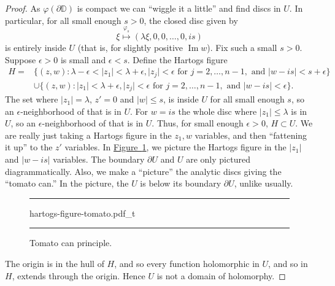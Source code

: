 \documentclass[12pt,openany]{book}
\renewcommand{\Im}{\operatorname{Im}}
\newcommand{\sabs}[1]{\lvert {#1} \rvert}
\newcommand{\D}{{\mathbb{D}}}
\theoremstyle{plain}
\theoremstyle{remark}
\theoremstyle{definition}
\newenvironment{myfig}{%
\begin{figure}[h!t]
\noindent\rule{\textwidth}{0.5pt}\vspace{12pt}\par\centering}%
{\par\noindent\rule{\textwidth}{0.5pt}
\end{figure}}
\theoremstyle{exercise}
\theoremstyle{example}
\newcommand{\figureref}[1]{\hyperref[#1]{Figure~\ref*{#1}}}
\begin{document}
\begin{proof}
As $\varphi(\partial \D)$ is compact we can ``wiggle it a little'' and
find discs in $U$.  In particular, for all small enough $s > 0$,
the closed disc given by
\begin{equation*}
\xi \overset{\varphi_s}{\mapsto} (\lambda \xi, 0, 0, \ldots, 0, i s) 
\end{equation*}
is entirely inside $U$ (that is, for slightly positive $\Im w$).
Fix such a small $s > 0$.
Suppose $\epsilon > 0$ is small and $\epsilon < s$.
Define the Hartogs figure
\begin{equation*}
\begin{split}
H =
& \bigl\{ (z,w) : \lambda - \epsilon < \sabs{z_1} < \lambda + \epsilon,
\sabs{z_j} < \epsilon \text{ for } j=2,\ldots,n-1, \text{ and }
\sabs{w-is} < s+\epsilon \bigr\} 
\\
&
\cup 
\bigl\{ (z,w) : \sabs{z_1} < \lambda + \epsilon, 
\sabs{z_j} < \epsilon \text{ for } j=2,\ldots,n-1, \text{ and }
\sabs{w-is} < \epsilon \bigr\} .
\end{split}
\end{equation*}
The set where $\sabs{z_1} = \lambda$, $z' = 0$
and $\sabs{w} \leq s$, is inside $U$ for all small enough $s$, so
an $\epsilon$-neighborhood of that is in $U$.
For
$w = is$ the whole disc where $\sabs{z_1} \leq \lambda$ is in $U$,
so an $\epsilon$-neighborhood of that is in $U$.
Thus, for small enough $\epsilon >0$, $H \subset U$.
We are really just taking a Hartogs figure in the $z_1,w$ variables, and then
``fattening it up'' to the $z'$ variables.
In \figureref{fig:hartogs-figure-tomato}, we picture the Hartogs figure in the $\sabs{z_1}$ and $\sabs{w-is}$
variables.  The boundary $\partial U$ and $U$ are only pictured diagrammatically.
Also, we make a ``picture'' the analytic discs giving the ``tomato can.''
In the picture, the $U$ is below its boundary $\partial U$, unlike usually.

\begin{myfig}
{hartogs-figure-tomato.pdf_t}
\caption{Tomato can principle.\label{fig:hartogs-figure-tomato}}
\end{myfig}

The origin is in the hull of $H$, and so
every function holomorphic in $U$, and so in $H$, extends through the origin.
Hence $U$ is not a domain of holomorphy.
\end{proof}
\end{document}
